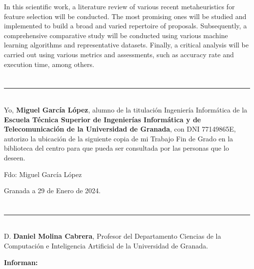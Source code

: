 In this scientific work, a literature review of various recent metaheuristics for feature selection will be conducted. The most promising ones will be studied and implemented to build a broad and varied repertoire of proposals. Subsequently, a comprehensive comparative study will be conducted using various machine learning algorithms and representative datasets. Finally, a critical analysis will be carried out using various metrics and assessments, such as accuracy rate and execution time, among others.\\[6pt]

\chapter*{}
\thispagestyle{empty}

\noindent\rule[-1ex]{\textwidth}{2pt}\\[4.5ex]

Yo, \textbf{Miguel García López}, alumno de la titulación Ingeniería Informática de la \textbf{Escuela Técnica Superior
       de Ingenierías Informática y de Telecomunicación de la Universidad de Granada}, con DNI 77149865E, autorizo la
ubicación de la siguiente copia de mi Trabajo Fin de Grado en la biblioteca del centro para que pueda ser
consultada por las personas que lo deseen.

\vspace{6cm}

\noindent Fdo: Miguel García López

\vspace{2cm}

\begin{flushright}
       Granada a 29 de Enero de 2024.
\end{flushright}


\chapter*{}
\thispagestyle{empty}

\noindent\rule[-1ex]{\textwidth}{2pt}\\[4.5ex]

D. \textbf{Daniel Molina Cabrera}, Profesor del Departamento Ciencias de la Computación e Inteligencia Artificial de la Universidad de Granada.

\vspace{0.5cm}
\textbf{Informan:}

\vspace{0.5cm}


